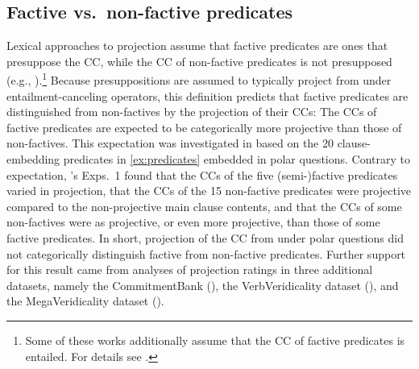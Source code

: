 \documentclass[a4paper,12pt,twoside]{article}
\newcommand{\posscite}[1]{\citeauthor{#1}'s (\citeyear{#1})}
\newcommand{\poscite}[1]{\citeauthor{#1}'s \citeyear{#1}}
\begin{document}

	\subsection{Factive vs.\ non-factive predicates}\label{s:factivity}

        Lexical approaches to projection assume that factive predicates are ones that presuppose the CC, while the CC of non-factive predicates is not presupposed (e.g., \citealt{kiparsky_fact_1970,karttunen_observations_1971,schlenker_local_2010,abrusan_predicting_2011}).\footnote{Some of these works additionally assume that the CC of factive predicates is entailed. For details see \citealt{degen_are_2022}.} Because presuppositions are assumed to typically project from under entailment-canceling operators, this definition predicts that factive predicates are distinguished from non-factives by the projection of their CCs: The CCs of factive predicates are expected to be categorically more projective than those of non-factives. This expectation was investigated in \citealt{degen_are_2022} based on the 20 clause-em\-bed\-ding predicates in \ref{ex:predicates} embedded in polar questions. Contrary to expectation, \poscite{degen_are_2022} Exps.~1 found that the CCs of the five (semi-)factive predicates varied in projection, that the CCs of the 15 non-factive predicates were projective compared to the non-projective main clause contents, and that the CCs of some non-factives were as projective, or even more projective, than those of some factive predicates.  In short, projection of the CC from under polar questions did not categorically distinguish factive from non-factive predicates. Further support for this result came from analyses of projection ratings in three additional datasets, namely the CommitmentBank (\citealt{de_marneffe_commitmentbank_2019}), the VerbVeridicality dataset (\citealt{ross_how_2019}), and the MegaVeridicality  dataset (\citealt{white_role_2018}).
        
\end{document}
